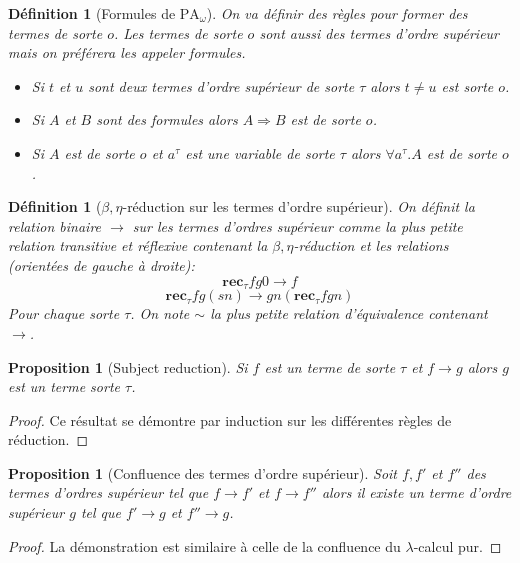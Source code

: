 \documentclass[a4paper,12pt]{article}
\newtheorem{prop}[theo]{Proposition}
\newtheorem{defi}[theo]{Définition}
\theoremstyle{rmqstyle}
\newcommand{\PA}{\mathrm{PA}}
\newcommand{\rec}{\mathbf{rec}}
\renewcommand{\implies}{\Rightarrow}
\begin{document}
\begin{defi}[Formules de $\PA_\omega$]
On va définir des règles pour former des termes de sorte $o$. Les termes de sorte $o$ sont aussi des termes d'ordre supérieur mais on préférera les appeler formules.
\begin{itemize}
\setlength\itemsep{ -1 em}
\item Si $t$ et $u$ sont deux termes d'ordre supérieur de sorte $\tau$ alors $t \neq u$ est sorte $o$.\\
\item Si $A$ et $B$ sont des formules alors $A \implies B$ est de sorte $o$.\\
\item Si $A$ est de sorte $o$ et $a^\tau$ est une variable de sorte $\tau$ alors $\forall a^\tau. A$ est de sorte $o$.
\end{itemize}
\end{defi}

\begin{defi}[$\beta, \eta$-réduction sur les termes d'ordre supérieur]
On définit la relation binaire $\longrightarrow$ sur les termes d'ordres supérieur comme la plus petite relation transitive et réflexive contenant la $\beta, \eta$-réduction et les relations (orientées de gauche à droite):
$$ \rec_\tau f g 0 \longrightarrow f$$
$$\rec_\tau f g (sn) \longrightarrow g n (\rec_\tau f g n)$$
Pour chaque sorte $\tau$. On note $\sim$ la plus petite relation d'équivalence contenant $\longrightarrow$.
\end{defi}

\begin{prop}[Subject reduction]
Si $f$ est un terme de sorte $\tau$ et $f \longrightarrow g$ alors $g$ est un terme sorte $\tau$. 
\end{prop}

\begin{proof}
Ce résultat se démontre par induction sur les différentes règles de réduction. 
\end{proof}

\begin{prop}[Confluence des termes d'ordre supérieur]
Soit $f, f'$ et $f''$ des termes d'ordres supérieur tel que $f \longrightarrow f'$ et $f \longrightarrow f''$ alors il existe un terme d'ordre supérieur $g$ tel que $f' \longrightarrow g$ et $f'' \longrightarrow g$.
\end{prop}

\begin{proof}
La démonstration est similaire à celle de la confluence du $\lambda$-calcul pur.
\end{proof}
\end{document}
